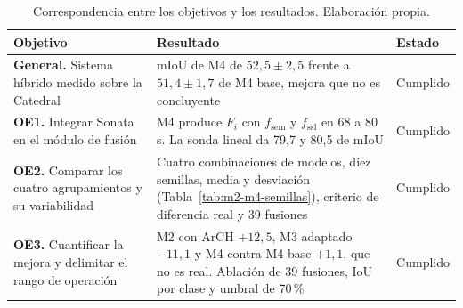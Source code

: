 \begin{table}[!htbp]
\centering
{}\small
\setlength{\tabcolsep}{5pt}
\renewcommand{\arraystretch}{1.15}
\caption[Correspondencia entre objetivos y resultados]{Correspondencia entre los objetivos y los resultados. Elaboración propia.}
\label{tab:objetivos}
\begin{tabularx}{\linewidth}{@{}>{\raggedright\arraybackslash\hsize=0.8\hsize}X>{\raggedright\arraybackslash\hsize=1.7\hsize}X>{\raggedright\arraybackslash\hsize=0.5\hsize}X@{}}
\toprule
\textbf{Objetivo} & \textbf{Resultado} & \textbf{Estado} \\
\midrule
\textbf{General.} Sistema híbrido medido sobre la Catedral & mIoU de M4 de $52{,}5\pm2{,}5$ frente a $51{,}4\pm1{,}7$ de M4 base, mejora que no es concluyente & Cumplido \\
\addlinespace[3pt]
\textbf{OE1.} Integrar Sonata en el módulo de fusión & M4 produce $F_i$ con $f_{\mathrm{sem}}$ y $f_{\mathrm{ssl}}$ en 68 a 80\,s. La sonda lineal da 79{,}7 y 80{,}5 de mIoU & Cumplido \\
\addlinespace[3pt]
\textbf{OE2.} Comparar los cuatro agrupamientos y su variabilidad & Cuatro combinaciones de modelos, diez semillas, media y desviación (Tabla~\ref{tab:m2-m4-semillas}), criterio de diferencia real y 39 fusiones & Cumplido \\
\addlinespace[3pt]
\textbf{OE3.} Cuantificar la mejora y delimitar el rango de operación & M2 con ArCH $+12{,}5$, M3 adaptado $-11{,}1$ y M4 contra M4 base $+1{,}1$, que no es real. Ablación de 39 fusiones, IoU por clase y umbral de 70\,\% & Cumplido \\
\bottomrule
\end{tabularx}
\end{table}
